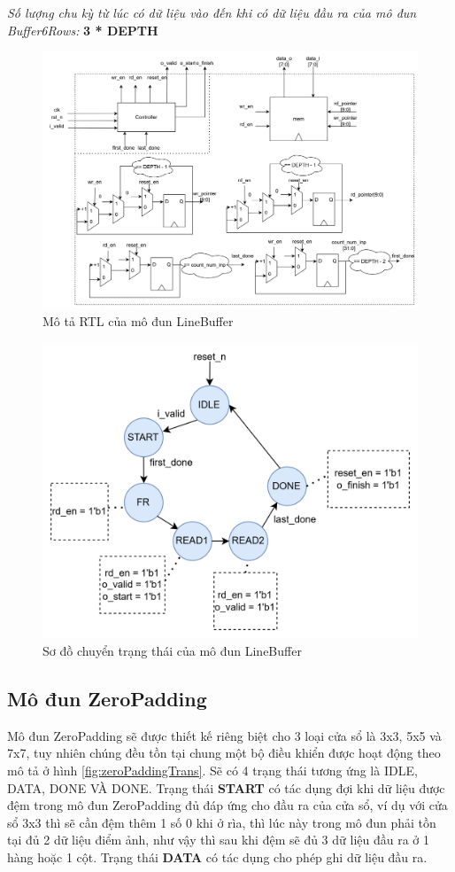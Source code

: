 \textit{Số lượng chu kỳ từ lúc có dữ liệu vào đến khi có dữ liệu đầu ra của mô đun Buffer6Rows: } \textbf{3 * DEPTH}


\begin{figure}[!ht]
    \centering
    \includegraphics[width=\linewidth]{figures/lineBuffArchitecture.png}
    \caption{Mô tả RTL của mô đun LineBuffer}
    \label{fig:lineBuffArchitecture}
\end{figure}


\begin{figure}[!ht]
    \centering
    \includegraphics[width=0.8\linewidth]{figures/lineBufferTrans.png}
    \caption{Sơ đồ chuyển trạng thái của mô đun LineBuffer}
    \label{fig:lineBufferTrans}
\end{figure}


\subsection{Mô đun ZeroPadding}
Mô đun ZeroPadding sẽ được thiết kế riêng biệt cho 3 loại cửa sổ là 3x3, 5x5 và 7x7, tuy nhiên chúng đều tồn tại chung một bộ điều khiển được hoạt động theo mô tả ở hình \ref{fig:zeroPaddingTrans}. Sẽ có 4 trạng thái tương ứng là IDLE, DATA, DONE VÀ DONE. Trạng thái \textbf{START} có tác dụng đợi khi dữ liệu được đệm trong mô đun ZeroPadding đủ đáp ứng cho đầu ra của cửa sổ, ví dụ với cửa sổ 3x3 thì sẽ cần đệm thêm 1 số 0 khi ở rìa, thì lúc này trong mô đun phải tồn tại đủ 2 dữ liệu điểm ảnh, như vậy thì sau khi đệm sẽ đủ 3 dữ liệu đầu ra ở 1 hàng hoặc 1 cột. Trạng thái \textbf{DATA} có tác dụng cho phép ghi dữ liệu đầu ra.  

